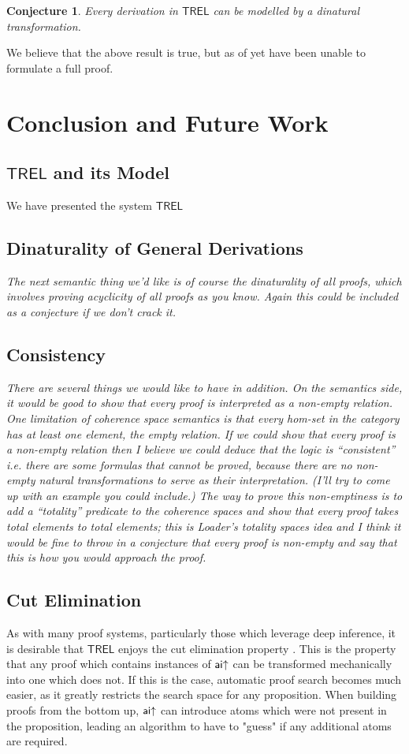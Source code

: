 \documentclass[11pt, oneside]{article}
\theoremstyle{plain}
\newtheorem{conjecture}[theorem]{Conjecture}
\theoremstyle{definition}
\newcommand{\sSys}{{\mathsf{TREL}}}%
\begin{document}
\begin{conjecture}
Every derivation in $\sSys$ can be modelled by a dinatural transformation.
\end{conjecture}

We believe that the above result is true, but as of yet have been unable to formulate a full proof.

\newpage
\section{Conclusion and Future Work}

\subsection{$\sSys$ and its Model}
We have presented the system $\sSys$ 

\subsection{Dinaturality of General Derivations}
\textit{The next semantic thing we'd like is of course the dinaturality of all proofs, which involves proving acyclicity of all proofs as you know.
Again this could be included as a conjecture if we don't crack it.}

\subsection{Consistency}
\textit{There are several things we would like to have in addition.
On the semantics side, it would be good to show that every proof is interpreted as a non-empty relation.
One limitation of coherence space semantics is that every hom-set in the category has at least one element, the empty relation.
If we could show that every proof is a non-empty relation then I believe we could deduce that the logic is “consistent” i.e. there are some formulas that cannot be proved, because there are no non-empty natural transformations to serve as their interpretation.
(I'll try to come up with an example you could include.)
The way to prove this non-emptiness is to add a “totality” predicate to the coherence spaces and show that every proof takes total elements to total elements;
this is Loader’s totality spaces idea and I think it would be fine to throw in a conjecture that every proof is non-empty and say that this is how you would approach the proof.}

\subsection{Cut Elimination}
As with many proof systems, particularly those which leverage deep inference, it is desirable that $\sSys$ enjoys the cut elimination property \cite{brunnler2006cut}.
This is the property that any proof which contains instances of ${\mathsf {ai}}{ \uparrow}$ can be transformed mechanically into one which does not.
If this is the case, automatic proof search becomes much easier, as it greatly restricts the search space for any proposition.
When building proofs from the bottom up, ${\mathsf {ai}}{ \uparrow}$ can introduce atoms which were not present in the proposition, leading an algorithm to have to "guess" if any additional atoms are required.
\end{document}

